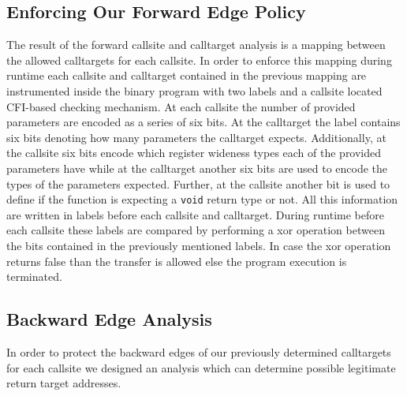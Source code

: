 \subsection{Enforcing Our Forward Edge Policy}
\label{Enforcing The Forward Edge Policy}
The result of the forward callsite and calltarget analysis is a mapping between the allowed calltargets for each callsite.
In order to enforce this mapping during runtime each callsite and calltarget contained in the previous mapping are instrumented
inside the binary program with two labels and a callsite located CFI-based checking mechanism. At each callsite the number of 
provided parameters are encoded as a series of six bits. At the calltarget the label contains six bits denoting how 
many parameters the calltarget expects. Additionally, at the callsite six bits encode which register wideness types each of the provided parameters have 
while at the calltarget another six bits are used to encode the types of the parameters expected. Further, at the callsite another bit 
is used to define if the function is expecting a \texttt{void} return type or not. All this information are written in labels before
each callsite and calltarget. During runtime before each callsite these labels are compared by performing a xor operation between 
the bits contained in the previously mentioned labels. In case the xor operation returns false
than the transfer is allowed else the program execution is terminated.

\subsection{Backward Edge Analysis}
\label{Backward Edge Analysis}
In order to protect the backward edges of our previously 
determined calltargets for each callsite we designed an
analysis which can determine possible legitimate return target addresses.


